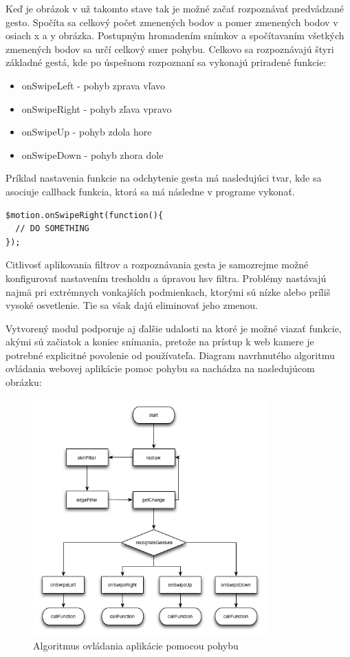 Keď je obrázok v už takomto stave tak je možné začať rozpoznávať predvádzané gesto. Spočíta sa celkový počet zmenených bodov a pomer zmenených bodov v osiach x a y obrázka. Postupným hromadením snímkov a spočítavaním všetkých zmenených bodov sa určí celkový smer pohybu. Celkovo sa rozpoznávajú štyri základné gestá, kde po úspešnom rozpoznaní sa vykonajú priradené funkcie:

\begin{itemize}
  \item onSwipeLeft - pohyb zprava vľavo
  \item onSwipeRight - pohyb zľava vpravo
  \item onSwipeUp - pohyb zdola hore
  \item onSwipeDown - pohyb zhora dole 
\end{itemize}

Príklad nastavenia funkcie na odchytenie gesta má nasledujúci tvar, kde sa asociuje callback funkcia, ktorá sa má následne v programe vykonať.

\begin{lstlisting}
$motion.onSwipeRight(function(){
  // DO SOMETHING
});
\end{lstlisting}

Citlivosť aplikovania filtrov a rozpoznávania gesta je samozrejme možné konfigurovať nastavením tresholdu a úpravou hsv filtra. Problémy nastávajú najmä pri extrémnych vonkajších podmienkach, ktorými sú nízke alebo príliš vysoké osvetlenie. Tie sa však dajú eliminovať jeho zmenou.

Vytvorený modul podporuje aj ďalšie udalosti na ktoré je možné viazať funkcie, akými sú začiatok a koniec snímania, pretože na prístup k web kamere je potrebné explicitné povolenie od používateľa. Diagram navrhnutého algoritmu ovládania webovej aplikácie pomoc pohybu sa nachádza na nasledujúcom obrázku:

\begin{figure}[H]
  \centering
  \includegraphics[width=0.8\textwidth]{diagram/motion.png}
  \caption[Algoritmus ovládania aplikácie pomocou pohybu]{
    Algoritmus ovládania aplikácie pomocou pohybu}
  \label{fig: diamotion}
\end{figure}

